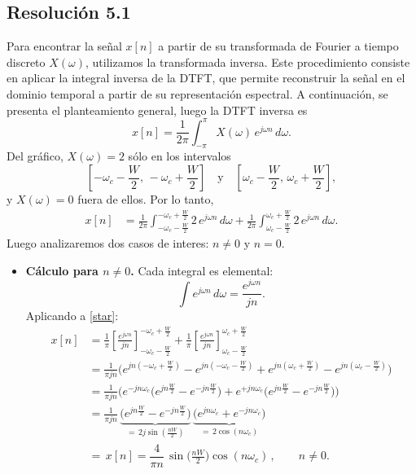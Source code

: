 \documentclass[
  11pt,
  letterpaper,
   addpoints,
   answers
  ]{exam}
\begin{document}
\begin{questions}
\begin{solution}
\subsection*{Resolución 5.1}
 Para encontrar la señal $x[n]$ a partir de su transformada de Fourier a tiempo discreto $X(\omega)$, utilizamos la transformada inversa. Este procedimiento consiste en aplicar la integral inversa de la DTFT, que permite reconstruir la señal en el dominio temporal a partir de su representación espectral. A continuación, se presenta el planteamiento general, luego la DTFT inversa es
\[
x[n]=\frac{1}{2\pi}\int_{-\pi}^{\pi}X(\omega)\,e^{j\omega n}\,d\omega.
\]
Del gráfico, $X(\omega)=2$ sólo en los intervalos
\[
\left[-\omega_c-\frac{W}{2},\, -\omega_c+\frac{W}{2}\right]
\quad\text{y}\quad
\left[\omega_c-\frac{W}{2},\, \omega_c+\frac{W}{2}\right],
\]
y $X(\omega)=0$ fuera de ellos. Por lo tanto,
\begin{align*}
x[n]
&=\frac{1}{2\pi}\int_{-\omega_c-\frac{W}{2}}^{-\omega_c+\frac{W}{2}}2\,e^{j\omega n}\,d\omega
+\frac{1}{2\pi}\int_{\omega_c-\frac{W}{2}}^{\omega_c+\frac{W}{2}}2\,e^{j\omega n}\,d\omega. \tag{$\star$}\label{star}
\end{align*}
Luego analizaremos dos casos de interes: $n\neq 0$ y $n=0$.
\begin{itemize}
  \item  \textbf{Cálculo para $n\neq 0$.} Cada integral es elemental:
\[
\int e^{j\omega n}\,d\omega=\frac{e^{j\omega n}}{j n}.
\]
Aplicando a \eqref{star}:
\begin{align*}
x[n]
&=\frac{1}{\pi}\left[\frac{e^{j\omega n}}{j n}\right]_{-\omega_c-\frac{W}{2}}^{-\omega_c+\frac{W}{2}}
+\frac{1}{\pi}\left[\frac{e^{j\omega n}}{j n}\right]_{\omega_c-\frac{W}{2}}^{\omega_c+\frac{W}{2}}\\[2mm]
&=\frac{1}{\pi j n}\Big(
e^{j n(-\omega_c+\frac{W}{2})}-e^{j n(-\omega_c-\frac{W}{2})}
+e^{j n(\omega_c+\frac{W}{2})}-e^{j n(\omega_c-\frac{W}{2})}
\Big)\\[1mm]
&=\frac{1}{\pi j n}\Big(
e^{-j n\omega_c}\big(e^{j n\frac{W}{2}}-e^{-j n\frac{W}{2}}\big)
+e^{+j n\omega_c}\big(e^{j n\frac{W}{2}}-e^{-j n\frac{W}{2}}\big)
\Big)\\[1mm]
&=\frac{1}{\pi j n}\,\underbrace{\big(e^{j n\frac{W}{2}}-e^{-j n\frac{W}{2}}\big)}_{=\,2j\sin(\frac{nW}{2})}\,
\underbrace{\big(e^{j n\omega_c}+e^{-j n\omega_c}\big)}_{=\,2\cos(n\omega_c)}\\[1mm]
&=\boxed{\,x[n]=\dfrac{4}{\pi n}\,\sin\!\Big(\frac{nW}{2}\Big)\cos(n\omega_c)\,},\qquad n\neq 0.
\end{align*}

\end{itemize}
\end{solution}
\end{questions}
\end{document}
